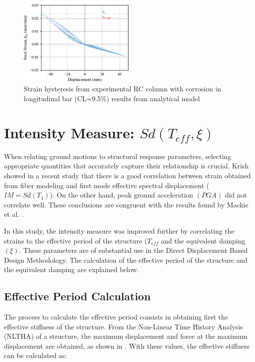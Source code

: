 \begin{figure}[htbp]
	\centering
	\includegraphics[width=0.5\textwidth]{VAC Thesis 2.0/Chapter-5/figs/Calibration_Ma_et_al_strain.pdf}
	\caption{Strain hysteresis from experimental RC column with corrosion in longitudinal bar (CL=9.5\%) results from analytical model}
	\label{fig:ModelCalibration_Corrosion_Hysteresis}
\end{figure}

\section{Intensity Measure: $Sd(T_{eff},\xi)$}

When relating ground motions to structural response parameters, selecting appropriate quantities that accurately capture their relationship is crucial. Krish \cite{Krish2018} showed in a recent study that there is a good correlation between strain obtained from fiber modeling and first mode effective spectral displacement ($IM=Sd(T_1)$). On the other hand, peak ground acceleration $(PGA)$ did not correlate well. These conclusions are congruent with the results found by Mackie et al. \cite{Mackie2003}. 

In this study, the intensity measure was improved further by correlating the strains to the effective period of the structure $(T_{eff}$ and the equivalent damping $(\xi)$. These parameters are of substantial use in the Direct Displacement Based Design Methodology. The calculation of the effective period of the structure and the equivalent damping are explained below.

\subsection{Effective Period Calculation}

The process to calculate the effective period consists in obtaining first the effective stiffness of the structure. From the Non-Linear Time History Analysis (NLTHA) of a structure, the maximum displacement and force at the maximum displacement are obtained, as shown in . With these values, the effective stiffness can be calculated as:


